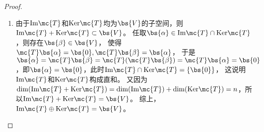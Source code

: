 \documentclass[12pt, a4paper, oneside, UTF8]{ctexbook}
\begin{document}
\begin{proof}
\begin{enumerate}[label=(\arabic{*})]
    \item 由于$\mathrm{Im}\mc{T}$和$\mathrm{Ker}\mc{T}$均为$\bs{V}$的子空间，则
    $\mathrm{Im}\mc{T}+ \mathrm{Ker}\mc{T} \subset \bs{V}$。
    任取$\bs{\alpha}\in \mathrm{Im}\mc{T}\cap \mathrm{Ker}\mc{T}$，则存在$\bs{\beta}\in \bs{V}$，
    使得$\mc{T}\bs{\alpha}=\bs{0},\mc{T} \bs{\beta}=\bs{\alpha} $，
    于是$\bs{\alpha}=\mc{T}\bs{\beta}=\mc{T}(\mc{T} \bs{\beta})=
    \mc{T}\bs{\alpha}=\bs{0}$，即$\bs{\alpha}=\bs{0}$，此时$\mathrm{Im}\mc{T}\cap \mathrm{Ker}\mc{T}=\{\bs{0}\}$，
    这说明$\mathrm{Im}\mc{T}$和$\mathrm{Ker}\mc{T}$构成直和。
    又因为$\mathrm{dim}(\mathrm{Im}\mc{T}+\mathrm{Ker}\mc{T})=\mathrm{dim}(\mathrm{Im}\mc{T})
    +\mathrm{dim}(\mathrm{Ker}\mc{T})=n$，所以$\mathrm{Im}\mc{T}+ \mathrm{Ker}\mc{T} = \bs{V}$。
    综上，$\mathrm{Im}\mc{T}\oplus \mathrm{Ker}\mc{T} = \bs{V}$。
\end{enumerate}
\end{proof}

\ifx\allfiles\undefined
\end{document}
